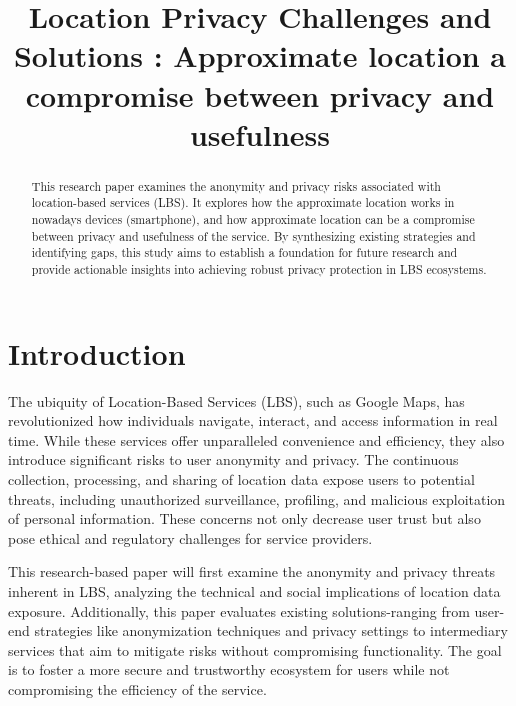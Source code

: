 \documentclass[9pt,conference]{IEEEtran}
\begin{document}
\title{Location Privacy Challenges and Solutions : Approximate location a compromise between privacy and usefulness }
\author{
}
\maketitle
\begin{abstract}
This research paper examines the anonymity and privacy risks associated with location-based services (LBS). It explores how the approximate location works in nowadays devices (smartphone), and how approximate location can be a compromise between privacy and usefulness of the service. By synthesizing existing strategies and identifying gaps, this study aims to establish a foundation for future research and provide actionable insights into achieving robust privacy protection in LBS ecosystems.
\end{abstract}

\section{Introduction}

The ubiquity of Location-Based Services (LBS), such as Google Maps, has revolutionized how individuals navigate, interact, and access information in real time. While these services offer unparalleled convenience and efficiency, they also introduce significant risks to user anonymity and privacy. The continuous collection, processing, and sharing of location data expose users to potential threats, including unauthorized surveillance, profiling, and malicious exploitation of personal information\cite{insidegnss2023privacy}. These concerns not only decrease user trust but also pose ethical and regulatory challenges for service providers.  

This research-based paper will first examine the anonymity and privacy threats inherent in LBS, analyzing the technical and social implications of location data exposure. Additionally, this paper evaluates existing solutions-ranging from user-end strategies like anonymization techniques and privacy settings to intermediary services that aim to mitigate risks without compromising functionality. The goal is to foster a more secure and trustworthy ecosystem for users while not compromising the efficiency of the service.
\end{document}
